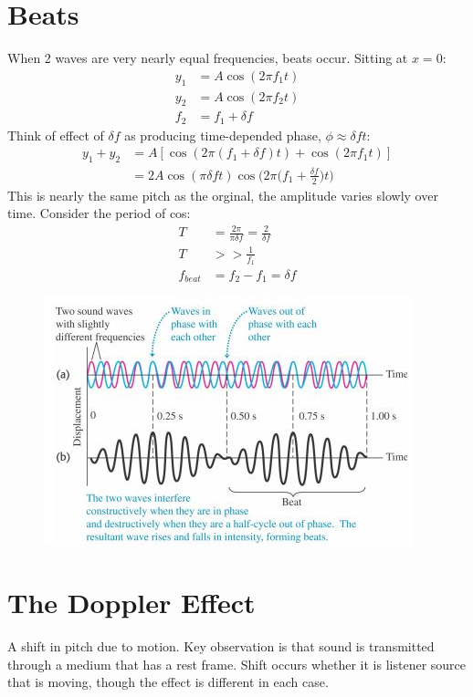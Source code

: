 \documentclass[a4paper, 11pt, normalem]{report}
\begin{document}
\section{Beats}
When 2 waves are very nearly equal frequencies, beats occur.
Sitting at $x = 0$:
\begin{align}
    y_{1} &= A\cos{(2\pi f_{1}t)} \\
    y_{2} &= A\cos{(2\pi f_{2}t)} \\
    f_{2} &= f_{1} + \delta f
\end{align}
Think of effect of $\delta f$ as producing time-depended phase, $\phi \approx \delta ft$:
\begin{align}
    y_{1} + y_{2} &= A[\cos{(2\pi(f_{1} + \delta f)t)} + \cos{(2\pi f_{1}t)}] \\
                  &= 2A\cos{(\pi\delta ft)}\cos{\Big(2\pi\Big(f_{1} + \frac{\delta f}{2}\Big)t\Big)}
\end{align}
This is nearly the same pitch as the orginal, the amplitude varies slowly over time.
Consider the period of cos:
\begin{align}
    T &= \frac{2\pi}{\pi\delta f} = \frac{2}{\delta f} \\
    T &>> \frac{1}{f_{1}} \\
    f_{beat} &= f_{2} - f_{1} = \delta f
\end{align}
\begin{figure}[H]
    \centering
    \includegraphics[scale=0.8]{Beat.jpg}
\end{figure}

\section{The Doppler Effect}
A shift in pitch due to motion.
Key observation is that sound is transmitted through a medium that has a rest frame.
Shift occurs whether it is listener source that is moving, though the effect is different in each case.
\end{document}
